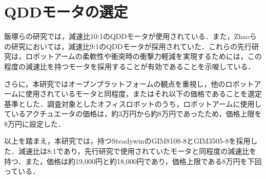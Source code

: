 \section{QDDモータの選定}
飯塚ら\cite{飯塚浩太2021}の研究では，減速比10:1のQDDモータが使用されている．また，Zhaoら\cite{10106520}の研究においては，減速比9:1のQDDモータが採用されていた．これらの先行研究は，ロボットアームの柔軟性や衝突時の衝撃力軽減を実現するためには，この程度の減速比を持つモータを採用することが有効であることを示唆している．

さらに，本研究ではオープンプラットフォームの観点を重視し，他のロボットアームに使用されているモータと同程度，またはそれ以下の価格であることを選定基準とした．調査対象としたオフィスロボットのうち，ロボットアームに使用しているアクチュエータの価格は，約3万円から約8万円であったため，価格上限を8万円に設定した．

以上を踏まえ，本研究では，持つSteadywinのGIM8108-8とGIM3505-8を採用した．減速比は8:1であり，先行研究で使用されていたモータと同程度の減速比を持つ．また，価格は約19,000円と約18,000円であり，価格上限である8万円を下回っている．
